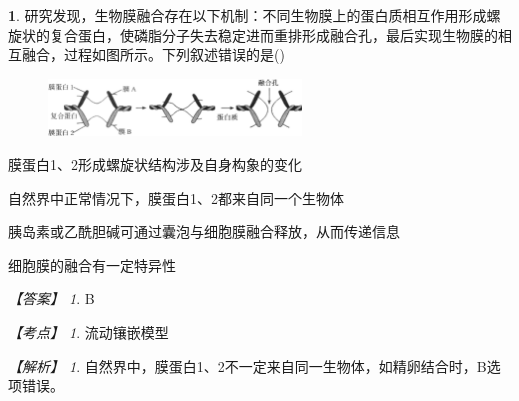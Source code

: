 \documentclass[UTF8, 10pt, a4paper, oneside]{ctexart}
\theoremstyle{definition}
\newtheorem{exercise}{}
\theoremstyle{remark}
\newtheorem*{answer}{【答案】}
\newtheorem*{point}{【考点】}      %
\newtheorem*{explanation}{【解析】}     %
\theoremstyle{plain}
\begin{document}
\begin{exercise}
    研究发现，生物膜融合存在以下机制：不同生物膜上的蛋白质相互作用形成螺旋状的复合蛋白，使磷脂分子失去稳定进而重排形成融合孔，最后实现生物膜的相互融合，过程如图所示。下列叙述错误的是\quad(\quad)
    \begin{figure}[h!]
        \centering
        \includegraphics[width=0.6\textwidth]{assists/12-1.jpg}
    \end{figure}
    \begin{adjustwidth}{4em}{}
        \begin{asparaenum}[A. ]
            \item 膜蛋白1、2形成螺旋状结构涉及自身构象的变化
            \item 自然界中正常情况下，膜蛋白1、2都来自同一个生物体
            \item 胰岛素或乙酰胆碱可通过囊泡与细胞膜融合释放，从而传递信息
            \item 细胞膜的融合有一定特异性
        \end{asparaenum}
    \end{adjustwidth}
    \begin{answer}
        B
    \end{answer}
    \begin{point}
        流动镶嵌模型
    \end{point}
    \begin{explanation}
        自然界中，膜蛋白1、2不一定来自同一生物体，如精卵结合时，B选项错误。
    \end{explanation}
\end{exercise}





















\newpage
\end{document}
